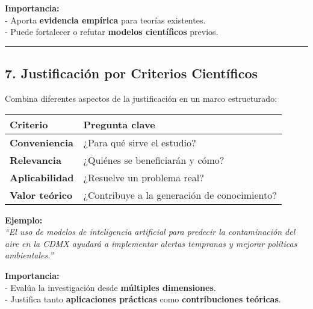 \documentclass[
  letterpaper,
  DIV=11,
  numbers=noendperiod]{scrartcl}
\begin{document}
\textbf{Importancia:}\\
- Aporta \textbf{evidencia empírica} para teorías existentes.\\
- Puede fortalecer o refutar \textbf{modelos científicos} previos.

\begin{center}\rule{0.5\linewidth}{0.5pt}\end{center}

\subsection{\texorpdfstring{\textbf{7. Justificación por Criterios
Científicos}}{7. Justificación por Criterios Científicos}}\label{justificaciuxf3n-por-criterios-cientuxedficos}

Combina diferentes aspectos de la justificación en un marco
estructurado:

\begin{longtable}[]{@{}
  >{\raggedright\arraybackslash}p{}
  >{\raggedright\arraybackslash}p{}@{}}
\toprule\noalign{}
\begin{minipage}[b]{\linewidth}\raggedright
\textbf{Criterio}
\end{minipage} & \begin{minipage}[b]{\linewidth}\raggedright
\textbf{Pregunta clave}
\end{minipage} \\
\midrule\noalign{}
\endhead
\bottomrule\noalign{}
\endlastfoot
\textbf{Conveniencia} & ¿Para qué sirve el estudio? \\
\textbf{Relevancia} & ¿Quiénes se beneficiarán y cómo? \\
\textbf{Aplicabilidad} & ¿Resuelve un problema real? \\
\textbf{Valor teórico} & ¿Contribuye a la generación de conocimiento? \\
\end{longtable}

\textbf{Ejemplo:}\\
\emph{``El uso de modelos de inteligencia artificial para predecir la
contaminación del aire en la CDMX ayudará a implementar alertas
tempranas y mejorar políticas ambientales.''}

\textbf{Importancia:}\\
- Evalúa la investigación desde \textbf{múltiples dimensiones}.\\
- Justifica tanto \textbf{aplicaciones prácticas} como
\textbf{contribuciones teóricas}.
\end{document}
